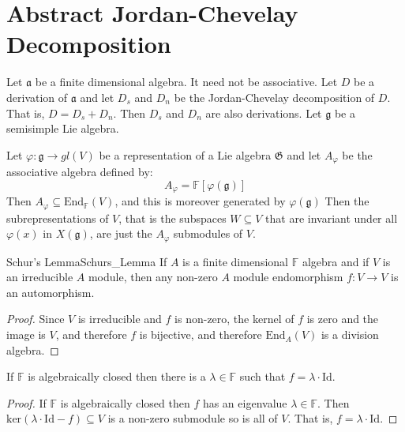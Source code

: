 \documentclass[crop=false,class=article]{standalone}                           %
\begin{document}
    \section{Abstract Jordan-Chevelay Decomposition}
        Let $\mathfrak{a}$ be a finite dimensional algebra. It need not be
        associative. Let $D$ be a derivation of $\mathfrak{a}$ and let
        $D_{s}$ and $D_{n}$ be the Jordan-Chevelay decomposition of $D$. That
        is, $D=D_{s}+D_{n}$. Then $D_{s}$ and $D_{n}$ are also derivations. Let
        $\mathfrak{g}$ be a semisimple Lie algebra.
        \par\hfill\par
        Let $\varphi:\mathfrak{g}\rightarrow{gl}(V)$ be a representation of a
        Lie algebra $\mathfrak{G}$ and let $A_{\varphi}$ be the associative
        algebra defined by:
        \begin{equation}
            A_{\varphi}=\mathbb{F}[\varphi(\mathfrak{g})]
        \end{equation}
        Then $A_{\varphi}\subseteq\textrm{End}_{\mathbb{F}}(V)$, and this is
        moreover generated by $\varphi(\mathfrak{g})$ Then the
        subrepresentations of $V$, that is the subspaces $W\subseteq{V}$ that
        are invariant under all $\varphi(x)$ in $X(\mathfrak{g})$, are just the
        $A_{\varphi}$ submodules of $V$.
        \begin{ltheorem}{Schur's Lemma}{Schurs_Lemma}
            If $A$ is a finite dimensional $\mathbb{F}$ algebra and if $V$ is
            an irreducible $A$ module, then any non-zero $A$ module
            endomorphism $f:V\rightarrow{V}$ is an automorphism.
        \end{ltheorem}
        \begin{proof}
            Since $V$ is irreducible and $f$ is non-zero, the kernel of $f$ is
            zero and the image is $V$, and therefore $f$ is bijective, and
            therefore $\textrm{End}_{A}(V)$ is a division algebra.
        \end{proof}
        \begin{theorem}
            If $\mathbb{F}$ is algebraically closed then there is a
            $\lambda\in\mathbb{F}$ such that $f=\lambda\cdot\textrm{Id}$.
        \end{theorem}
        \begin{proof}
            If $\mathbb{F}$ is algebraically closed then $f$ has an eigenvalue
            $\lambda\in\mathbb{F}$. Then
            $\textrm{ker}(\lambda\cdot\textrm{Id}-f)\subseteq{V}$ is a non-zero
            submodule so is all of $V$. That is, $f=\lambda\cdot\textrm{Id}$.
        \end{proof}
\end{document}
